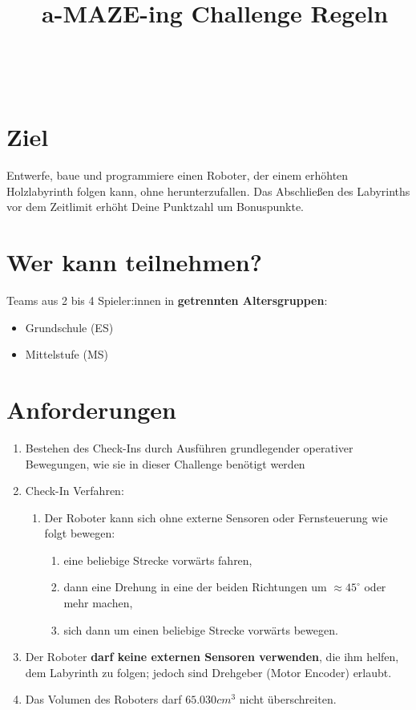 \documentclass[a4paper,12pt]{article}
\begin{document}



\title{\tagYear\ a-MAZE-ing Challenge Regeln}

\makeatletter
\let\inserttitle\@title
\makeatother
\begin{center}
	\rrgerLogo
	\huge                      %
	\bfseries                   %
	\\
	\inserttitle
\end{center}
\section{Ziel}
Entwerfe, baue und programmiere einen Roboter, der einem erhöhten Holzlabyrinth
folgen kann, ohne herunterzufallen. Das Abschließen des Labyrinths vor dem
Zeitlimit erhöht Deine Punktzahl um Bonuspunkte.

\section{Wer kann teilnehmen?}
Teams aus 2 bis 4 Spieler:innen in \textbf{getrennten Altersgruppen}:

\begin{itemize}
	\item Grundschule (ES)
	\item Mittelstufe (MS)
\end{itemize}
\combineDivisions

\section{Anforderungen}
\robotRequirements
\begin{enumerate}
	\item Bestehen des Check-Ins durch Ausführen grundlegender operativer
		Bewegungen, wie sie in dieser Challenge benötigt werden
	\item Check-In Verfahren:
	\begin{enumerate}
		\item Der Roboter kann sich ohne externe Sensoren oder
			Fernsteuerung wie folgt bewegen:
		\begin{enumerate}
			\item eine beliebige Strecke vorwärts fahren,
			\item dann eine Drehung in eine der beiden Richtungen
				um $\approx 45^{\circ}$ oder mehr machen,
			\item sich dann um einen beliebige Strecke vorwärts
				bewegen.
		\end{enumerate}
	\end{enumerate}
	\item Der Roboter \textbf{darf keine externen Sensoren verwenden}, die
		ihm helfen, dem Labyrinth zu folgen; jedoch sind Drehgeber
		(Motor Encoder) erlaubt.
	\item Das Volumen des Roboters darf $65.030 cm^{3}$ nicht überschreiten.
\end{enumerate}
\end{document}

